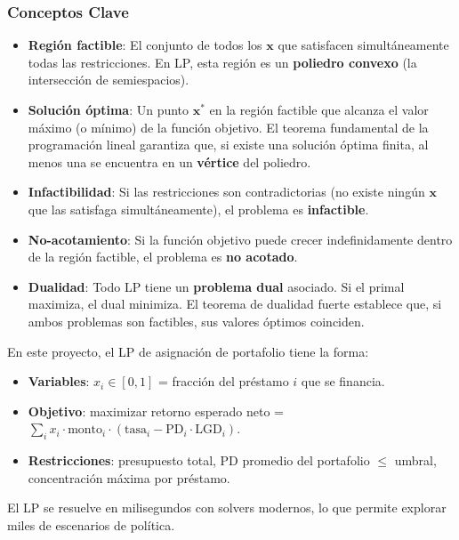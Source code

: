 \documentclass[
  spanish,
  11pt,
  letterpaper,
]{scrbook}
\providecommand{\tightlist}{%
  \setlength{\itemsep}{0pt}\setlength{\parskip}{0pt}}
\theoremstyle{plain}
\theoremstyle{remark}
\begin{document}
\subsubsection{Conceptos Clave}\label{conceptos-clave}

\begin{itemize}
\tightlist
\item
  \textbf{Región factible}: El conjunto de todos los \(\mathbf{x}\) que
  satisfacen simultáneamente todas las restricciones. En LP, esta región
  es un \textbf{poliedro convexo} (la intersección de semiespacios).
\item
  \textbf{Solución óptima}: Un punto \(\mathbf{x}^*\) en la región
  factible que alcanza el valor máximo (o mínimo) de la función
  objetivo. El teorema fundamental de la programación lineal garantiza
  que, si existe una solución óptima finita, al menos una se encuentra
  en un \textbf{vértice} del poliedro.
\item
  \textbf{Infactibilidad}: Si las restricciones son contradictorias (no
  existe ningún \(\mathbf{x}\) que las satisfaga simultáneamente), el
  problema es \textbf{infactible}.
\item
  \textbf{No-acotamiento}: Si la función objetivo puede crecer
  indefinidamente dentro de la región factible, el problema es
  \textbf{no acotado}.
\item
  \textbf{Dualidad}: Todo LP tiene un \textbf{problema dual} asociado.
  Si el primal maximiza, el dual minimiza. El teorema de dualidad fuerte
  establece que, si ambos problemas son factibles, sus valores óptimos
  coinciden.
\end{itemize}

\begin{tcolorbox}[enhanced jigsaw, arc=.35mm, bottomrule=.15mm, bottomtitle=1mm, breakable, colback=white, colbacktitle=quarto-callout-note-color!10!white, colframe=quarto-callout-note-color-frame, coltitle=black, left=2mm, leftrule=.75mm, opacityback=0, opacitybacktitle=0.6, rightrule=.15mm, title=\textcolor{quarto-callout-note-color}{\faInfo}\hspace{0.5em}{LP en asignación de portafolio crediticio}, titlerule=0mm, toprule=.15mm, toptitle=1mm]

En este proyecto, el LP de asignación de portafolio tiene la forma:

\begin{itemize}
\tightlist
\item
  \textbf{Variables}: \(x_i \in [0, 1]\) = fracción del préstamo \(i\)
  que se financia.
\item
  \textbf{Objetivo}: maximizar retorno esperado neto =
  \(\sum_i x_i \cdot \text{monto}_i \cdot (\text{tasa}_i - \text{PD}_i \cdot \text{LGD}_i)\).
\item
  \textbf{Restricciones}: presupuesto total, PD promedio del portafolio
  \(\leq\) umbral, concentración máxima por préstamo.
\end{itemize}

El LP se resuelve en milisegundos con solvers modernos, lo que permite
explorar miles de escenarios de política.

\end{tcolorbox}
\end{document}
